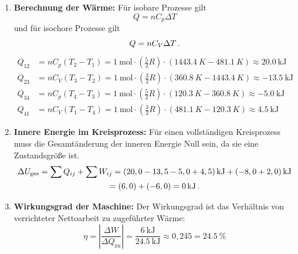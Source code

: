 \documentclass[ngerman]{scrreprt}
\newenvironment{loesungbox}[1]
  {\needspace{5\baselineskip}\begin{loesungboxstyle}[frametitle={#1}]}
  {\end{loesungboxstyle}}
\begin{document}
\begin{loesungbox}{Lösung zu \Cref{aufg:kreisprozess}}
\begin{enumerate}
    Dabei ist $\Delta U$ die Änderung der inneren Energie eines Systems, $\Delta Q$ die ihm zu- oder abgeführte Wärme und $\Delta W$ die am System verrichtete oder vom System geleistete Arbeit.
    \item \textbf{Berechnung der Wärme:} Für isobare Prozesse gilt 
    $$Q = n C_p \Delta T$$ 
    und für isochore Prozesse gilt 
    $$Q = n C_V \Delta T \,. $$
    \begin{align}
        Q_{12} &= n C_p (T_2 - T_1) = \SI{1}{\mole} \cdot (\tfrac{5}{2} R) \cdot (\SI{1443.4}{K}-\SI{481.1}{K}) \approx \SI{20.0}{\kilo\joule} \label{eq: kreisprozess_q12}\\
        Q_{23} &= n C_V (T_3 - T_2) = \SI{1}{\mole} \cdot (\tfrac{3}{2} R) \cdot (\SI{360.8}{K}-\SI{1443.4}{K}) \approx \SI{-13.5}{\kilo\joule} \label{eq: kreisprozess_q23}\\
        Q_{34} &= n C_p (T_4 - T_3) = \SI{1}{\mole} \cdot (\tfrac{5}{2} R) \cdot (\SI{120.3}{K}-\SI{360.8}{K}) \approx \SI{-5.0}{\kilo\joule} \label{eq: kreisprozess_q34}\\
        Q_{41} &= n C_V (T_1 - T_4) = \SI{1}{\mole} \cdot (\tfrac{3}{2} R) \cdot (\SI{481.1}{K}-\SI{120.3}{K}) \approx \SI{4.5}{\kilo\joule} \label{eq: kreisprozess_q41}
    \end{align}
    \item \textbf{Innere Energie im Kreisprozess:} Für einen vollständigen Kreisprozess muss die Gesamtänderung der inneren Energie Null sein, da sie eine Zustandsgröße ist.
    \begin{multline}
        \Delta U_{\text{ges}} = \sum Q_{ij} + \sum W_{ij} = (20,0 - 13,5 - 5,0 + 4,5)\,\si{\kilo\joule} + (-8,0 + 2,0)\,\si{\kilo\joule} \\
        = (6,0) +(-6,0) = \SI{0}{\kilo\joule} \,.
    \end{multline}
    \item \textbf{Wirkungsgrad der Maschine:} Der Wirkungsgrad ist das Verhältnis von verrichteter Nettoarbeit zu zugeführter Wärme:
    \begin{equation}\label{eq: wirkungsgrad_allg}
        \eta = \left| \frac{\Delta W}{\Delta Q_{\text{zu}}} \right| = \frac{\SI{6}{\kilo\joule}}{\SI{24.5}{\kilo\joule}} \approx 0,245 = \SI{24.5}{\percent}
    \end{equation}
\end{enumerate}
\end{loesungbox}
\end{document}
